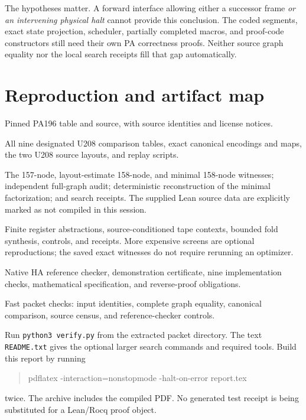 \documentclass[11pt,letterpaper]{article}
\newcommand{\file}[1]{\texttt{\nolinkurl{#1}}}
\begin{document}
The hypotheses matter. A forward interface allowing either a successor
frame \emph{or an intervening physical halt} cannot provide this conclusion.
The coded segments, exact state projection, scheduler, partially completed
macros, and proof-code constructors still need their own PA correctness
proofs. Neither source graph equality nor the local search receipts fill
that gap automatically.

\section{Reproduction and artifact map}

\begin{description}[style=nextline]
\item[\file{data/}]
Pinned PA196 table and source, with source identities and license notices.
\item[\file{comparison/}]
All nine designated U208 comparison tables, exact canonical encodings and
maps, the two U208 source layouts, and replay scripts.
\item[\file{source_reductions/}]
The 157-node, layout-estimate 158-node, and minimal 158-node witnesses;
independent full-graph audit; deterministic reconstruction of the minimal
factorization; and search receipts. The supplied Lean source data are
explicitly marked as not compiled in this session.
\item[\file{search/}]
Finite register abstractions, source-conditioned tape contexts, bounded
fold synthesis, controls, and receipts. More expensive screens are optional
reproductions; the saved exact witnesses do not require rerunning an
optimizer.
\item[\file{logic/}]
Native HA reference checker, demonstration certificate, nine implementation
checks, mathematical specification, and reverse-proof obligations.
\item[\file{verify.py}]
Fast packet checks: input identities, complete graph equality, canonical
comparison, source census, and reference-checker controls.
\end{description}

Run \file{python3 verify.py} from the extracted packet directory. The text
\file{README.txt} gives the optional larger search commands and required
tools. Build this report by running
\begin{quote}\ttfamily
pdflatex -interaction=nonstopmode -halt-on-error report.tex
\end{quote}
twice. The archive includes the compiled PDF. No generated test receipt is
being substituted for a Lean/Rocq proof object.
\end{document}
